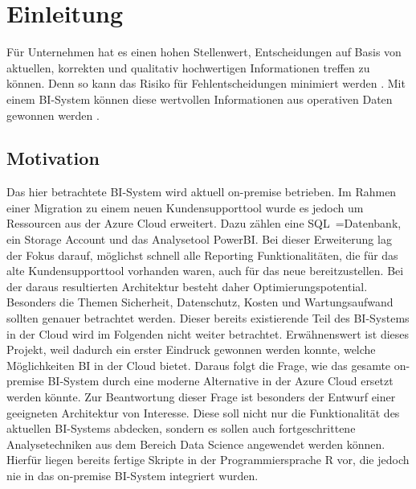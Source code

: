 \chapter{Einleitung} \label{ch:intro}
Für Unternehmen hat es einen hohen Stellenwert, Entscheidungen auf Basis von aktuellen, korrekten und qualitativ hochwertigen Informationen treffen zu können. Denn so kann das Risiko für Fehlentscheidungen minimiert werden \cite{grunwald_business_2009}. Mit einem BI-System können diese wertvollen Informationen aus operativen Daten gewonnen werden \cite{muller_business_2013}.

\section{Motivation} \label{sec:intro:motivation}
Das hier betrachtete BI-System wird aktuell on-premise betrieben. Im Rahmen einer Migration zu einem neuen Kundensupporttool wurde es jedoch um Ressourcen aus der Azure Cloud erweitert. Dazu zählen eine SQL~=Datenbank, ein Storage Account und das Analysetool PowerBI. Bei dieser Erweiterung lag der Fokus darauf, möglichst schnell alle Reporting Funktionalitäten, die für das alte Kundensupporttool vorhanden waren, auch für das neue bereitzustellen. Bei der daraus resultierten Architektur besteht daher Optimierungspotential. Besonders die Themen Sicherheit, Datenschutz, Kosten und Wartungsaufwand sollten genauer betrachtet werden. Dieser bereits existierende Teil des BI-Systems in der Cloud wird im Folgenden nicht weiter betrachtet. Erwähnenswert ist dieses Projekt, weil dadurch ein erster Eindruck gewonnen werden konnte, welche Möglichkeiten BI in der Cloud bietet. Daraus folgt die Frage, wie das gesamte on-premise BI-System durch eine moderne Alternative in der Azure Cloud ersetzt werden könnte. Zur Beantwortung dieser Frage ist besonders der Entwurf einer geeigneten Architektur von Interesse. Diese soll nicht nur die Funktionalität des aktuellen BI-Systems abdecken, sondern es sollen auch fortgeschrittene Analysetechniken aus dem Bereich Data Science angewendet werden können. Hierfür liegen bereits fertige Skripte in der Programmiersprache R vor, die jedoch nie in das on-premise BI-System integriert wurden.

